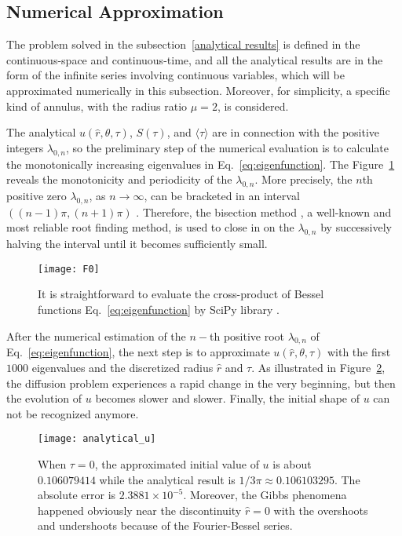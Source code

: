
\newpage
\subsection{Numerical Approximation}\label{numerical approximation}

The problem solved in the subsection~\ref{analytical results} is
defined in the continuous-space and continuous-time, and all the
analytical results are in the form of the infinite series involving
continuous variables, which will be approximated numerically in this
subsection. Moreover, for simplicity, a specific kind of annulus, with
the radius ratio $\mu=2$, is considered.

The analytical $u(\hat r, \theta, \tau)$, $S(\tau)$, and
$\langle \tau \rangle$ are in connection with the positive integers
$\lambda_{0,n}$, so the preliminary step of the numerical evaluation
is to calculate the monotonically increasing eigenvalues in
Eq.~\ref{eq:eigenfunction}.  The Figure~\ref{fig:F0} reveals the
monotonicity and periodicity of the $\lambda_{0,n}$. More precisely,
the $n$th positive zero $\lambda_{0,n}$, as $n \rightarrow \infty $,
can be bracketed in an interval $((n-1) \pi,
(n+1) \pi)$ \cite{NIST:DLMF}. Therefore, the bisection
method \cite{2020SciPy-NMeth}, a well-known and most reliable root
finding method, is used to close in on the $\lambda_{0,n}$ by
successively halving the interval until it becomes sufficiently small.

\begin{figure}[h!]
\centering
\texttt{[image: F0]}
\caption{It is straightforward to evaluate the cross-product of
Bessel functions Eq.~\ref{eq:eigenfunction} by SciPy
library \cite{2020SciPy-NMeth}. \label{fig:F0}}
\end{figure}


After the numerical estimation of the $n-$th positive root
$\lambda_{0,n}$ of Eq.~\ref{eq:eigenfunction}, the next step is to
approximate $u(\hat r, \theta, \tau)$ with the first $1000$
eigenvalues and the discretized radius $\hat r$ and $\tau$. As
illustrated in Figure~\ref{fig:u}, the diffusion problem experiences a
rapid change in the very beginning, but then the evolution of $u$
becomes slower and slower. Finally, the initial shape of $u$ can not
be recognized anymore.

\begin{figure}
\centering
\texttt{[image: analytical\_u]}
\caption{When $\tau=0$, the approximated initial value of $u$ is about $0.106079414$ while the analytical result is $1/3\pi \approx 0.106103295$. The absolute error is $2.3881 \times 10^{-5}$. Moreover, the Gibbs phenomena \cite{fay2003gibbs} happened obviously near the discontinuity $\hat r = 0$ with the overshoots and undershoots because of the Fourier-Bessel series. \label{fig:u}}
\end{figure}

